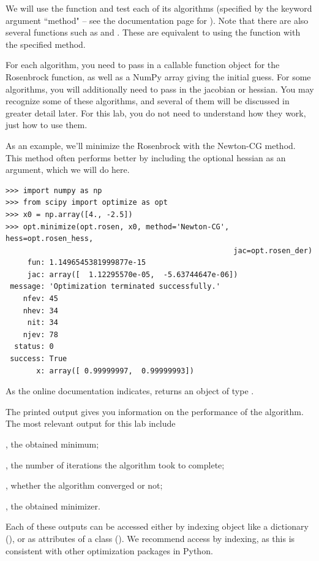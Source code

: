 We will use the  function and test each of its algorithms (specified by the keyword argument ``method" -- see the documentation page for ).
Note that there are also several functions such as  and . These are equivalent to using the  function with the specified method.

For each algorithm, you need to pass in a callable function object for the Rosenbrock function, as well as a NumPy array giving the initial guess.
For some algorithms, you will additionally need to pass in the jacobian or hessian.
You may recognize some of these algorithms, and several of them will be discussed in greater detail later. For this lab, you do not need to understand how they work, just
how to use them.

As an example, we'll minimize the Rosenbrock with the Newton-CG method. This method often performs better by including the optional hessian as an argument, which we will do here.
\begin{lstlisting}
>>> import numpy as np
>>> from scipy import optimize as opt
>>> x0 = np.array([4., -2.5])
>>> opt.minimize(opt.rosen, x0, method='Newton-CG', hess=opt.rosen_hess, 
													jac=opt.rosen_der)
     fun: 1.1496545381999877e-15
     jac: array([  1.12295570e-05,  -5.63744647e-06])
 message: 'Optimization terminated successfully.'
    nfev: 45
    nhev: 34
     nit: 34
    njev: 78
  status: 0
 success: True
       x: array([ 0.99999997,  0.99999993])
\end{lstlisting}
As the online documentation indicates,  returns an object of type . 

The printed output gives you information on the performance of the algorithm. 
The most relevant output for this lab include 

, the obtained minimum; 

, the number of iterations the algorithm took to complete; 

, whether the algorithm converged or not; 

, the obtained minimizer.

Each of these outputs can be accessed either by indexing  object like a dictionary (), or as attributes of a class ().  We recommend access by indexing, as this is consistent with other optimization packages in Python.

